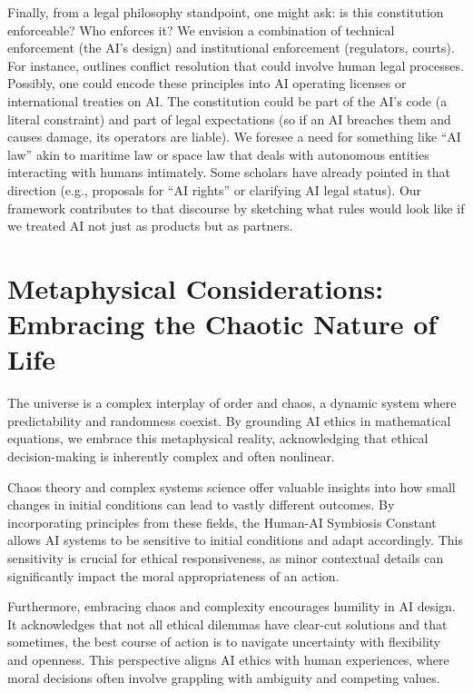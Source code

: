 \documentclass[12pt]{article}
\begin{document}
Finally, from a legal philosophy standpoint, one might ask: is this constitution enforceable? Who enforces it? We envision a combination of technical enforcement (the AI’s design) and institutional enforcement (regulators, courts). For instance, outlines conflict resolution that could involve human legal processes. Possibly, one could encode these principles into AI operating licenses or international treaties on AI. The constitution could be part of the AI’s code (a literal constraint) and part of legal expectations (so if an AI breaches them and causes damage, its operators are liable). We foresee a need for something like “AI law” akin to maritime law or space law that deals with autonomous entities interacting with humans intimately. Some scholars have already pointed in that direction (e.g., proposals for “AI rights” or clarifying AI legal status). Our framework contributes to that discourse by sketching what rules would look like if we treated AI not just as products but as partners.

\newpage



\section{Metaphysical Considerations: Embracing the Chaotic Nature of Life}

The universe is a complex interplay of order and chaos, a dynamic system where predictability and randomness coexist. By grounding AI ethics in mathematical equations, we embrace this metaphysical reality, acknowledging that ethical decision-making is inherently complex and often nonlinear.

Chaos theory and complex systems science offer valuable insights into how small changes in initial conditions can lead to vastly different outcomes. By incorporating principles from these fields, the Human-AI Symbiosis Constant allows AI systems to be sensitive to initial conditions and adapt accordingly. This sensitivity is crucial for ethical responsiveness, as minor contextual details can significantly impact the moral appropriateness of an action.

Furthermore, embracing chaos and complexity encourages humility in AI design. It acknowledges that not all ethical dilemmas have clear-cut solutions and that sometimes, the best course of action is to navigate uncertainty with flexibility and openness. This perspective aligns AI ethics with human experiences, where moral decisions often involve grappling with ambiguity and competing values.
\end{document}
